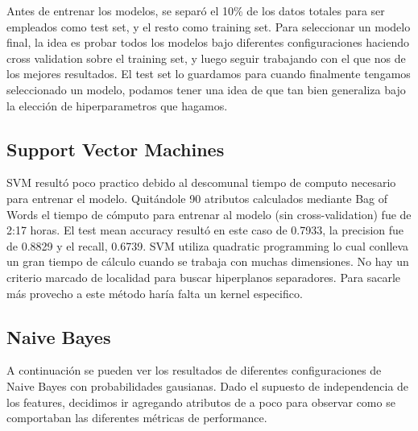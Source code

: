 \documentclass[10pt,a4paper]{article}
\begin{document}
Antes de entrenar los modelos, se separó el 10\% de los datos totales para ser empleados como test set, y el resto como training set. Para seleccionar un modelo final, la idea es probar todos los modelos bajo diferentes configuraciones haciendo cross validation sobre el training set, y luego seguir trabajando con el que nos de los mejores resultados. El test set lo guardamos para cuando finalmente tengamos seleccionado un modelo, podamos tener una idea de que tan bien generaliza bajo la elección de hiperparametros que hagamos.

\subsection{Support Vector Machines}

SVM resultó poco practico debido al descomunal tiempo de computo necesario para entrenar el modelo. Quitándole 90 atributos calculados mediante Bag of Words el tiempo de cómputo para entrenar al modelo (sin cross-validation) fue de 2:17 horas. El test mean accuracy resultó en este caso de 0.7933, la precision fue de 0.8829 y el recall, 0.6739. SVM utiliza quadratic programming lo cual conlleva un gran tiempo de cálculo cuando se trabaja con muchas dimensiones. No hay un criterio marcado de localidad para buscar hiperplanos separadores. Para sacarle más provecho a este método haría falta un kernel especifico.

\pagebreak

\subsection{Naive Bayes}

A continuación se pueden ver los resultados de diferentes configuraciones de Naive Bayes con probabilidades gausianas. Dado el supuesto de independencia de los features, decidimos ir agregando atributos de a poco para observar como se comportaban las diferentes métricas de performance.
\end{document}
